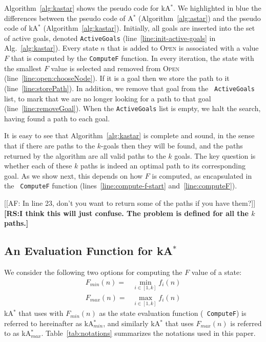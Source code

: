 \documentclass{aicom2e}
\newcommand{\astar}{A$^*$}
\newcommand{\kastar}{kA$^*$}
\newcommand{\kastarmin}{kA$^*_{min}$}
\newcommand{\kastarmax}{kA$^*_{max}$}
\newcommand{\minf}{$F_{min}(n)$}
\newcommand{\maxf}{$F_{max}(n)$}
\newcommand{\open}{\textsc{Open}}
\newcommand{\roni}[1]{\textbf{[RS:#1]}}
\begin{document}
Algorithm~\ref{alg:kastar} shows the pseudo code for \kastar{}.
We highlighted in blue
the differences between the pseudo code of \astar{} (Algorithm~\ref{alg:astar})
and the pseudo code of \kastar{} (Algorithm~\ref{alg:kastar}).
Initially, all goals are inserted into the set of active goals, denoted  {\tt ActiveGoals}
(line~\ref{line:init-active-goals} in Alg.~\ref{alg:kastar}). Every state
$n$ that is added to \open{} is associated with a value $F$ that is
computed by the {\tt ComputeF} function. In every iteration, the state with
the smallest $F$ value is selected and removed from \open{}
(line~\ref{line:open:chooseNode}). If it is a goal then we store the path to it
(line~\ref{line:storePath}). In addition, we remove that goal from the {\tt
ActiveGoals} list, to mark that we are no longer looking for a path to that
goal (line~\ref{line:removeGoal}). When the {\tt ActiveGoals} list is empty, we
halt the search, having found a path to each goal.

It is easy to see that Algorithm~\ref{alg:kastar} is complete and sound, in
the sense that if there are paths to the $k$-goals then they will be found, and the
paths returned by the algorithm are all valid paths to the $k$ goals. The key
question is whether each of these $k$ paths is indeed
an optimal path to its corresponding goal.
As we show next, this depends on how $F$ is computed, as encapsulated in the {\tt
ComputeF} function (lines~\ref{line:compute-f-start} and~\ref{line:computeF}).

[[AF: In line 23, don't you want to return some of the paths if you have
them?]]\roni{I think this will just confuse. The problem is defined for all the $k$ paths.}

\subsection{An Evaluation Function for \kastar{}}

We consider the following two options for computing the $F$ value of a state:
\begin{align}
\text{\minf{}}=&\min_{i\in [1,k]}f_i(n) \\
\text{\maxf{}}=&\max_{i\in [1,k]}f_i(n)
\end{align}
\kastar{} that uses with \minf{} as the state evaluation function ({\tt
ComputeF}) is referred to hereinafter as \kastarmin{}, and similarly \kastar{}
that uses \maxf{} is referred to as \kastarmax{}. Table~\ref{tab:notations}
summarizes the notations used in this paper.
\end{document}
